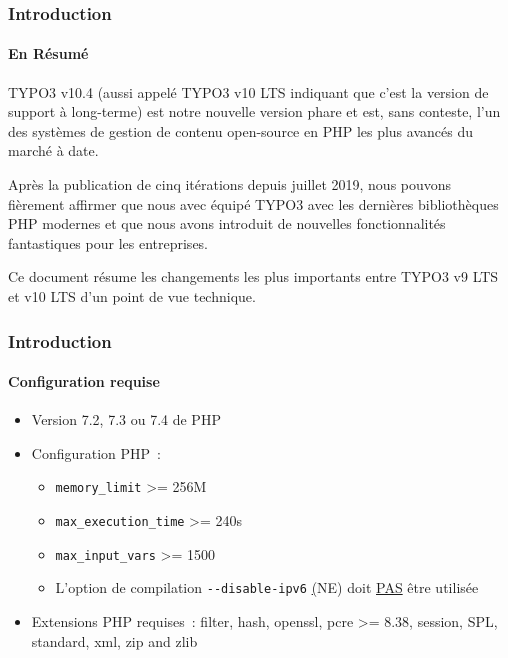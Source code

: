 \begin{frame}[fragile]
	\frametitle{Introduction}
	\framesubtitle{En Résumé}

	\small
		TYPO3 v10.4 (aussi appelé TYPO3 v10 LTS indiquant que c'est la version de support à long-terme)
		est notre nouvelle version phare et est, sans conteste, l'un des systèmes de gestion
		de contenu open-source en PHP les plus avancés du marché à date.

		\vspace{0.2cm}

		Après la publication de cinq itérations depuis juillet 2019, nous pouvons fièrement
		affirmer que nous avec équipé TYPO3 avec les dernières bibliothèques PHP modernes et
		que nous avons introduit de nouvelles fonctionnalités fantastiques pour les entreprises.

		\vspace{0.2cm}

		Ce document résume les changements les plus importants entre TYPO3 v9 LTS et v10 LTS
		d'un point de vue technique.

%


	\normalsize

\end{frame}


\begin{frame}[fragile]
	\frametitle{Introduction}
	\framesubtitle{Configuration requise}

	\begin{itemize}
		\item Version 7.2, 7.3 ou 7.4 de PHP
		\item Configuration PHP~:

			\begin{itemize}
				\item \texttt{memory\_limit} >= 256M
				\item \texttt{max\_execution\_time} >= 240s
				\item \texttt{max\_input\_vars} >= 1500
				\item L'option de compilation \texttt{-}\texttt{-disable-ipv6}
					\underline(NE) doit \underline{PAS} être utilisée
			\end{itemize}

			\item Extensions PHP requises~:\newline
				\small
					filter, hash, openssl, pcre >= 8.38, session, SPL, standard,
					xml, zip and zlib
				\normalsize

		\end{itemize}

\end{frame}

